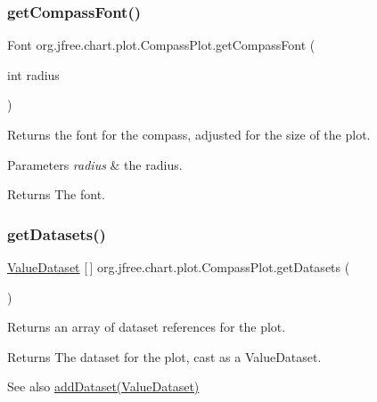 \subsubsection{\texorpdfstring{get\+Compass\+Font()}{getCompassFont()}}
{\footnotesize\ttfamily Font org.\+jfree.\+chart.\+plot.\+Compass\+Plot.\+get\+Compass\+Font (\begin{DoxyParamCaption}\item[{int}]{radius }\end{DoxyParamCaption})\hspace{0.3cm}{\ttfamily [protected]}}

Returns the font for the compass, adjusted for the size of the plot.


\begin{DoxyParams}{Parameters}
{\em radius} & the radius.\\
\hline
\end{DoxyParams}
\begin{DoxyReturn}{Returns}
The font. 
\end{DoxyReturn}
\mbox{\label{classorg_1_1jfree_1_1chart_1_1plot_1_1_compass_plot_a699c39ee9364f618d9e06e5a5a4c07cb}} 
\subsubsection{\texorpdfstring{get\+Datasets()}{getDatasets()}}
{\footnotesize\ttfamily \mbox{\hyperlink{interfaceorg_1_1jfree_1_1data_1_1general_1_1_value_dataset}{Value\+Dataset}} \mbox{[}$\,$\mbox{]} org.\+jfree.\+chart.\+plot.\+Compass\+Plot.\+get\+Datasets (\begin{DoxyParamCaption}{ }\end{DoxyParamCaption})}

Returns an array of dataset references for the plot.

\begin{DoxyReturn}{Returns}
The dataset for the plot, cast as a Value\+Dataset.
\end{DoxyReturn}
\begin{DoxySeeAlso}{See also}
\mbox{\hyperlink{classorg_1_1jfree_1_1chart_1_1plot_1_1_compass_plot_a3a3398e3cbb7a45f105c374b8f223587}{add\+Dataset(\+Value\+Dataset)}} 
\end{DoxySeeAlso}
\mbox{\label{classorg_1_1jfree_1_1chart_1_1plot_1_1_compass_plot_a7e539c5097083903be1d9db04a28e5c8}} 
